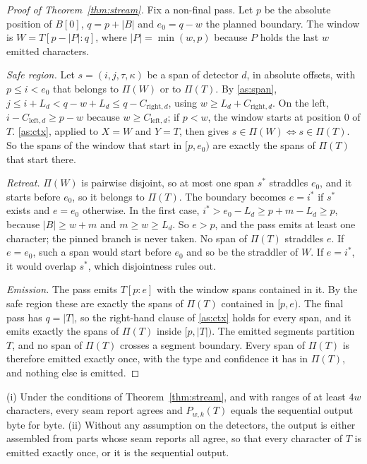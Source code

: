 \documentclass[pdflatex,sn-mathphys-num]{sn-jnl}
\theoremstyle{\ssThmStyle}
\theoremstyle{\ssDefStyle}
\begin{document}
\begin{proof}[Proof of Theorem~\ref{thm:stream}]
Fix a non-final pass. Let $p$ be the absolute position of $B[0]$, $q = p + |B|$ and $e_0 = q - w$ the planned boundary. The window is $W = T[p - |P| : q]$, where $|P| = \min(w, p)$ because $P$ holds the last $w$ emitted characters.

\emph{Safe region.} Let $s = (i, j, \tau, \kappa)$ be a span of detector $d$, in absolute offsets, with $p \le i < e_0$ that belongs to $\Pi(W)$ or to $\Pi(T)$. By \ref{as:span}, $j \le i + L_d < q - w + L_d \le q - C_{\mathrm{right},d}$, using $w \ge L_d + C_{\mathrm{right},d}$. On the left, $i - C_{\mathrm{left},d} \ge p - w$ because $w \ge C_{\mathrm{left},d}$; if $p < w$, the window starts at position 0 of $T$. \ref{as:ctx}, applied to $X = W$ and $Y = T$, then gives $s \in \Pi(W) \Leftrightarrow s \in \Pi(T)$. So the spans of the window that start in $[p, e_0)$ are exactly the spans of $\Pi(T)$ that start there.

\emph{Retreat.} $\Pi(W)$ is pairwise disjoint, so at most one span $s^{*}$ straddles $e_0$, and it starts before $e_0$, so it belongs to $\Pi(T)$. The boundary becomes $e = i^{*}$ if $s^{*}$ exists and $e = e_0$ otherwise. In the first case, $i^{*} > e_0 - L_d \ge p + m - L_d \ge p$, because $|B| \ge w + m$ and $m \ge w \ge L_d$. So $e > p$, and the pass emits at least one character; the pinned branch is never taken. No span of $\Pi(T)$ straddles $e$. If $e = e_0$, such a span would start before $e_0$ and so be the straddler of $W$. If $e = i^{*}$, it would overlap $s^{*}$, which disjointness rules out.

\emph{Emission.} The pass emits $T[p{:}e]$ with the window spans contained in it. By the safe region these are exactly the spans of $\Pi(T)$ contained in $[p, e)$. The final pass has $q = |T|$, so the right-hand clause of \ref{as:ctx} holds for every span, and it emits exactly the spans of $\Pi(T)$ inside $[p, |T|)$. The emitted segments partition $T$, and no span of $\Pi(T)$ crosses a segment boundary. Every span of $\Pi(T)$ is therefore emitted exactly once, with the type and confidence it has in $\Pi(T)$, and nothing else is emitted.
\end{proof}

\begin{theorem}\label{thm:par}
(i) Under the conditions of Theorem~\ref{thm:stream}, and with ranges of at least $4w$ characters, every seam report agrees and $P_{w,k}(T)$ equals the sequential output byte for byte. (ii) Without any assumption on the detectors, the output is either assembled from parts whose seam reports all agree, so that every character of $T$ is emitted exactly once, or it is the sequential output.
\end{theorem}
\end{document}
